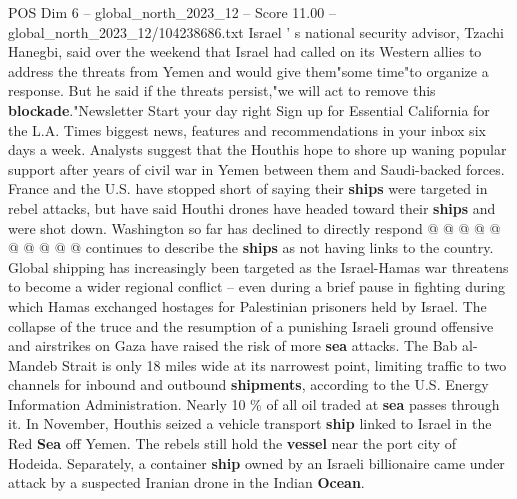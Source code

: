 \begin{textsample}{POS Dim 6 – global\_north\_2023\_12 – Score 11.00 – global\_north\_2023\_12/104238686.txt}
Israel ' s national security advisor, Tzachi Hanegbi, said over the weekend that Israel had called on its Western allies to address the threats from Yemen and would give them"some time"to organize a response.
But he said if the threats persist,"we will act to remove this \textbf{blockade}."Newsletter Start your day right Sign up for Essential California for the L.A.
Times biggest news, features and recommendations in your inbox six days a week.
Analysts suggest that the Houthis hope to shore up waning popular support after years of civil war in Yemen between them and Saudi-backed forces.
France and the U.S. have stopped short of saying their \textbf{ships} were targeted in rebel attacks, but have said Houthi drones have headed toward their \textbf{ships} and were shot down.
Washington so far has declined to directly respond @ @ @ @ @ @ @ @ @ @ continues to describe the \textbf{ships} as not having links to the country.
Global shipping has increasingly been targeted as the Israel-Hamas war threatens to become a wider regional conflict -- even during a brief pause in fighting during which Hamas exchanged hostages for Palestinian prisoners held by Israel.
The collapse of the truce and the resumption of a punishing Israeli ground offensive and airstrikes on Gaza have raised the risk of more \textbf{sea} attacks.
The Bab al-Mandeb Strait is only 18 miles wide at its narrowest point, limiting traffic to two channels for inbound and outbound \textbf{shipments}, according to the U.S.
Energy Information Administration.
Nearly 10 \% of all oil traded at \textbf{sea} passes through it.
In November, Houthis seized a vehicle transport \textbf{ship} linked to Israel in the Red \textbf{Sea} off Yemen.
The rebels still hold the \textbf{vessel} near the port city of Hodeida.
Separately, a container \textbf{ship} owned by an Israeli billionaire came under attack by a suspected Iranian drone in the Indian \textbf{Ocean}.

\end{textsample}
